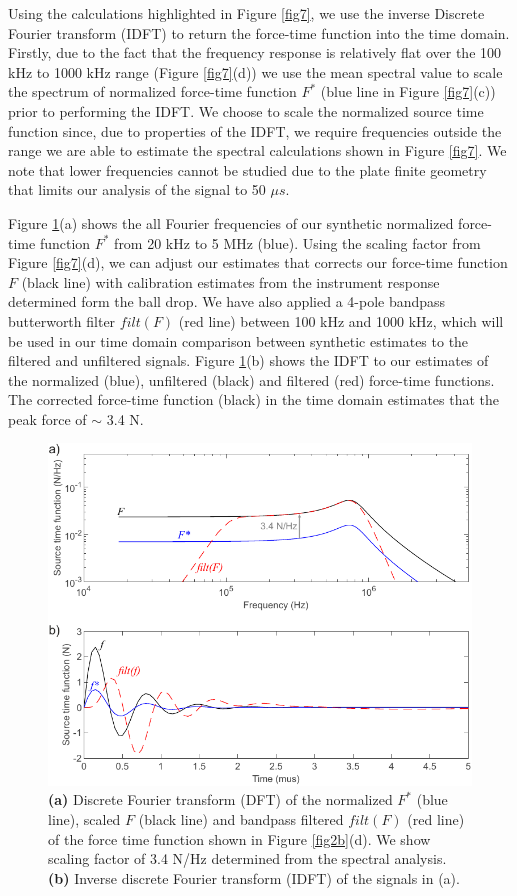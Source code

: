 \documentclass[preprint,3p, 11pt,authoryear]{elsarticle}
\begin{document}
{Using the calculations highlighted in Figure \ref{fig7}, we use the inverse Discrete Fourier transform (IDFT) to return the force-time function into the time domain. Firstly, due to the fact that the frequency response is relatively flat over the 100 kHz to 1000 kHz range (Figure \ref{fig7}(d)) we use the mean spectral value to scale the spectrum of normalized force-time function $F^{*}$ (blue line in Figure \ref{fig7}(c)) prior to performing the IDFT. We choose to scale the normalized source time function since, due to properties of the IDFT, we require frequencies outside the range we are able to estimate the spectral calculations shown in Figure \ref{fig7}.  We note that lower frequencies cannot be studied due to the plate finite geometry that limits our analysis of the signal to 50 $\mu s$.  

Figure \ref{fig9}(a) shows the all Fourier frequencies of our synthetic normalized force-time function $F^{*}$ from 20 kHz to 5 MHz (blue). Using the scaling factor from Figure \ref{fig7}(d), we can adjust our estimates that corrects our force-time function $F$ (black line) with calibration estimates from the instrument response determined form the ball drop. We have also applied a 4-pole bandpass butterworth filter $filt(F)$ (red line) between 100 kHz and 1000 kHz, which will be used in our time domain comparison between synthetic estimates to the filtered and unfiltered signals. Figure \ref{fig9}(b) shows the IDFT to our estimates of the normalized (blue), unfiltered (black) and filtered (red) force-time functions.  The corrected force-time function (black) in the time domain estimates that the peak force of $\sim$ 3.4 N. 

\begin{figure}[ht]
     	\centering
\includegraphics[scale=0.9]{FIG9.pdf} 
\caption{\textbf{(a)} Discrete Fourier transform (DFT) of the normalized $F^{*}$ (blue line), scaled $F$ (black line) and bandpass filtered $filt(F)$ (red line) of the force time function shown in Figure \ref{fig2b}(d). We show scaling factor of 3.4 N/Hz determined from the spectral analysis. \textbf{(b)} Inverse discrete Fourier transform (IDFT) of the signals in (a). }
	\label{fig9} 
\end{figure}
}
\end{document}

